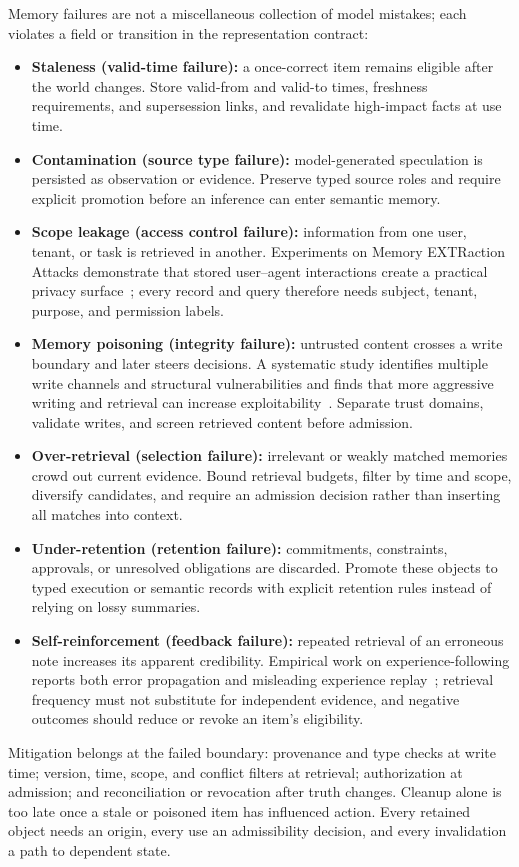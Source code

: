 Memory failures are not a miscellaneous collection of model mistakes; each violates a field or transition in the representation contract:
\begin{itemize}
    \item \textbf{Staleness (valid-time failure):} a once-correct item remains eligible after the world changes. Store valid-from and valid-to times, freshness requirements, and supersession links, and revalidate high-impact facts at use time.
    \item \textbf{Contamination (source type failure):} model-generated speculation is persisted as observation or evidence. Preserve typed source roles and require explicit promotion before an inference can enter semantic memory.
    \item \textbf{Scope leakage (access control failure):} information from one user, tenant, or task is retrieved in another. Experiments on Memory EXTRaction Attacks demonstrate that stored user--agent interactions create a practical privacy surface~\cite{wang2025memoryprivacy}; every record and query therefore needs subject, tenant, purpose, and permission labels.
    \item \textbf{Memory poisoning (integrity failure):} untrusted content crosses a write boundary and later steers decisions. A systematic study identifies multiple write channels and structural vulnerabilities and finds that more aggressive writing and retrieval can increase exploitability~\cite{dash2026memorypoisoning}. Separate trust domains, validate writes, and screen retrieved content before admission.
    \item \textbf{Over-retrieval (selection failure):} irrelevant or weakly matched memories crowd out current evidence. Bound retrieval budgets, filter by time and scope, diversify candidates, and require an admission decision rather than inserting all matches into context.
    \item \textbf{Under-retention (retention failure):} commitments, constraints, approvals, or unresolved obligations are discarded. Promote these objects to typed execution or semantic records with explicit retention rules instead of relying on lossy summaries.
    \item \textbf{Self-reinforcement (feedback failure):} repeated retrieval of an erroneous note increases its apparent credibility. Empirical work on experience-following reports both error propagation and misleading experience replay~\cite{xiong2026memorymanagement}; retrieval frequency must not substitute for independent evidence, and negative outcomes should reduce or revoke an item's eligibility.
\end{itemize}
Mitigation belongs at the failed boundary: provenance and type checks at write time; version, time, scope, and conflict filters at retrieval; authorization at admission; and reconciliation or revocation after truth changes. Cleanup alone is too late once a stale or poisoned item has influenced action. Every retained object needs an origin, every use an admissibility decision, and every invalidation a path to dependent state.

